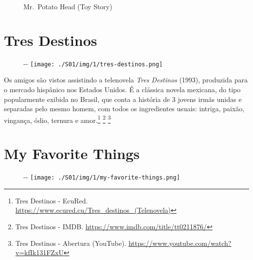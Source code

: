 \begin{figure}
  \centering
    \caption{Mr. Potato Head (Toy Story)\label{fig:mr-potato-head-toy-story}}
\end{figure}

\hypertarget{tres-destinos}{%
\section{Tres Destinos}\label{tres-destinos}}

\begin{figure}[!ht]
  \begin{adjustwidth}{-\oddsidemargin-1in}{-\rightmargin}
    \centering
    \texttt{[image: ./S01/img/1/tres-destinos.png]}
  \end{adjustwidth}
\end{figure}

Os amigos são vistos assistindo a telenovela \emph{Tres Destinos}
(1993), produzida para o mercado hispânico nos Estados Unidos. É a
clássica novela mexicana, do tipo popularmente exibida no Brasil, que
conta a história de 3 jovens irmãs unidas e separadas pelo mesmo homem,
com todos os ingredientes usuais: intriga, paixão, vingança, ódio,
ternura e amor.\footnote{\sloppy Tres Destinos - EcuRed. \url{https://www.ecured.cu/Tres_destinos_(Telenovela)}}
\footnote{\sloppy Tres Destinos - IMDB. \url{https://www.imdb.com/title/tt0211876/}}
\footnote{\sloppy Tres Destinos - Abertura (YouTube). \url{https://www.youtube.com/watch?v=kfIk131FZxU}}

\hypertarget{my-favorite-things}{%
\section{My Favorite Things}\label{my-favorite-things}}

\begin{figure}[!ht]
  \begin{adjustwidth}{-\oddsidemargin-1in}{-\rightmargin}
    \centering
    \texttt{[image: ./S01/img/1/my-favorite-things.png]}
  \end{adjustwidth}
\end{figure}

